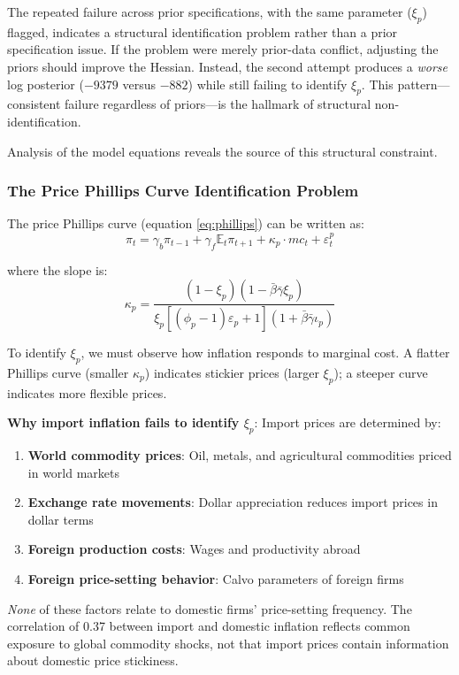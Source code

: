 \documentclass[12pt]{article}
\begin{document}
The repeated failure across prior specifications, with the same parameter ($\xi_p$) flagged, indicates a structural identification problem rather than a prior specification issue. If the problem were merely prior-data conflict, adjusting the priors should improve the Hessian. Instead, the second attempt produces a \textit{worse} log posterior ($-9379$ versus $-882$) while still failing to identify $\xi_p$. This pattern---consistent failure regardless of priors---is the hallmark of structural non-identification.

Analysis of the model equations reveals the source of this structural constraint.

\subsubsection{The Price Phillips Curve Identification Problem}

The price Phillips curve (equation \ref{eq:phillips}) can be written as:
\[
\pi_t = \gamma_b \pi_{t-1} + \gamma_f \mathbb{E}_t\pi_{t+1} + \kappa_p \cdot mc_t + \varepsilon^p_t
\]

where the slope is:
\[
\kappa_p = \frac{(1-\xi_p)(1-\bar{\beta}\bar{\gamma}\xi_p)}{\xi_p[(\phi_p-1)\varepsilon_p+1](1+\bar{\beta}\bar{\gamma}\iota_p)}
\]

To identify $\xi_p$, we must observe how inflation responds to marginal cost. A flatter Phillips curve (smaller $\kappa_p$) indicates stickier prices (larger $\xi_p$); a steeper curve indicates more flexible prices.

\textbf{Why import inflation fails to identify $\xi_p$}: Import prices are determined by:
\begin{enumerate}
    \item \textbf{World commodity prices}: Oil, metals, and agricultural commodities priced in world markets
    \item \textbf{Exchange rate movements}: Dollar appreciation reduces import prices in dollar terms
    \item \textbf{Foreign production costs}: Wages and productivity abroad
    \item \textbf{Foreign price-setting behavior}: Calvo parameters of foreign firms
\end{enumerate}

\textit{None} of these factors relate to domestic firms' price-setting frequency. The correlation of 0.37 between import and domestic inflation reflects common exposure to global commodity shocks, not that import prices contain information about domestic price stickiness.
\end{document}
